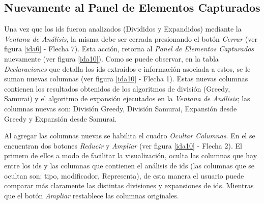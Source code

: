 \subsection{Nuevamente al Panel de Elementos Capturados}

Una vez que los ids fueron analizados (Divididos y Expandidos) mediante la \textit{Ventana de Análisis}, la misma debe ser cerrada presionando el botón \textit{Cerrar} (ver figura \ref{ida6} - Flecha 7). Esta acción, retorna al \textit{Panel de Elementos Capturados} nuevamente (ver figura \ref{ida10}).
Como se puede observar, en la tabla \textit{Declaraciones} que detalla los ids extraídos e información asociada a estos, se le suman nuevas columnas (ver figura \ref{ida10} - Flecha 1). Estas nuevas columnas contienen los resultados obtenidos de los algoritmos de división (Greedy, Samurai) y el algoritmo de expansión ejecutados en la \textit{Ventana de Análisis}; las columnas nuevas son: División Greedy, División Samurai, Expansión desde Greedy y Expansión desde Samurai.

Al agregar las columnas nuevas se habilita el cuadro \textit{Ocultar Columnas}. En el se encuentran dos botones \textit{Reducir} y \textit{Ampliar} (ver figura \ref{ida10} - Flecha 2). El primero de ellos a modo de facilitar la visualización, oculta las columnas que hay entre los ids y las columnas que contienen el análisis de ids (las columnas que se ocultan son: tipo, modificador, Representa), de esta manera el usuario puede comparar más claramente las distintas divisiones y expansiones de ids. Mientras que el botón \textit{Ampliar} restablece las columnas originales.


